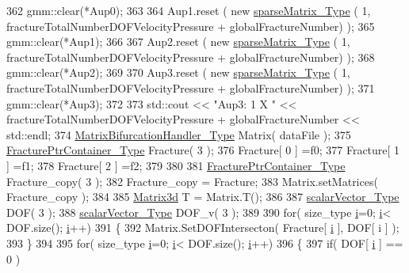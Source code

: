 \begin{DoxyCode}
362         gmm::clear(*Aup0);
363 
364         Aup1.reset ( \textcolor{keyword}{new} \hyperlink{Core_8h_afba9f623673e2ae32054015bdb5500f9}{sparseMatrix\_Type} ( 1, fractureTotalNumberDOFVelocityPressure + 
      globalFractureNumber) );
365         gmm::clear(*Aup1);
366 
367         Aup2.reset ( \textcolor{keyword}{new} \hyperlink{Core_8h_afba9f623673e2ae32054015bdb5500f9}{sparseMatrix\_Type} ( 1, fractureTotalNumberDOFVelocityPressure + 
      globalFractureNumber) );
368         gmm::clear(*Aup2);
369         
370         Aup3.reset ( \textcolor{keyword}{new} \hyperlink{Core_8h_afba9f623673e2ae32054015bdb5500f9}{sparseMatrix\_Type} ( 1, fractureTotalNumberDOFVelocityPressure + 
      globalFractureNumber) );
371         gmm::clear(*Aup3);
372             
373         std::cout << \textcolor{stringliteral}{"Aup3: 1 X "} << fractureTotalNumberDOFVelocityPressure + globalFractureNumber << 
      std::endl;
374         \hyperlink{classMatrixBifurcationHandler}{MatrixBifurcationHandler\_Type} Matrix( dataFile );
375         \hyperlink{FractureHandler_8h_a2f0b57e18ecf89912d7de0c87158009e}{FracturePtrContainer\_Type} Fracture( 3 );
376         Fracture[ 0 ] =f0;
377         Fracture[ 1 ] =f1;
378         Fracture[ 2 ] =f2;
379         
380 
381         \hyperlink{FractureHandler_8h_a2f0b57e18ecf89912d7de0c87158009e}{FracturePtrContainer\_Type} Fracture\_copy( 3 );
382         Fracture\_copy = Fracture;
383         Matrix.setMatrices( Fracture\_copy );
384         
385         \hyperlink{Core_8h_acd816705c6602062b91975525c4e3f6f}{Matrix3d} T = Matrix.T();
386                 
387         \hyperlink{Core_8h_a4e75b5863535ba1dd79942de2846eff0}{scalarVector\_Type} DOF( 3 );
388         \hyperlink{Core_8h_a4e75b5863535ba1dd79942de2846eff0}{scalarVector\_Type} DOF\_v( 3 );
389         
390         \textcolor{keywordflow}{for}( size\_type \hyperlink{matrici_8m_a6f6ccfcf58b31cb6412107d9d5281426}{i}=0; \hyperlink{matrici_8m_a6f6ccfcf58b31cb6412107d9d5281426}{i}< DOF.size(); \hyperlink{matrici_8m_a6f6ccfcf58b31cb6412107d9d5281426}{i}++)
391         \{
392             Matrix.SetDOFIntersecton( Fracture[ \hyperlink{matrici_8m_a6f6ccfcf58b31cb6412107d9d5281426}{i} ], DOF[ i ] );
393         \}
394         
395         \textcolor{keywordflow}{for}( size\_type \hyperlink{matrici_8m_a6f6ccfcf58b31cb6412107d9d5281426}{i}=0;  \hyperlink{matrici_8m_a6f6ccfcf58b31cb6412107d9d5281426}{i}< DOF.size(); \hyperlink{matrici_8m_a6f6ccfcf58b31cb6412107d9d5281426}{i}++)
396         \{
397             \textcolor{keywordflow}{if}( DOF[ \hyperlink{matrici_8m_a6f6ccfcf58b31cb6412107d9d5281426}{i} ] == 0 )

\end{DoxyCode}
